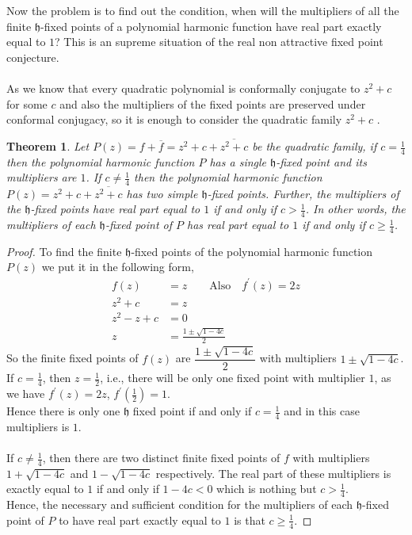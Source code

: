 \documentclass[a4paper,12pt,reqno]{amsart}
\newtheorem{thm}{Theorem}
\begin{document}
Now the problem is to find out the condition, when will the multipliers of all the finite $\mathfrak{h}$-fixed points of a polynomial harmonic function have real part exactly equal to $1$? This is an supreme situation of the real non attractive fixed point conjecture.
${}$\\ ${}$\\
 	As we know that every quadratic polynomial is conformally conjugate to $z^{2}+c$ for some $c$ and also the multipliers of the fixed points are preserved under conformal conjugacy, so it is enough to consider the quadratic family $z^{2}+c$ \cite{The real non-attractive fixed point conjecture and beyond}.
 	\begin{thm}\label{T3}
 	Let $P(z)=f+\overline{f}=z^{2}+c+\overline{z^{2}+c}$ be the quadratic family, if $c=\frac{1}{4}$ then the polynomial harmonic function $P$ has a single $\mathfrak{h}$-fixed point and its multipliers are $1$. If $c\neq\frac{1}{4}$ then the polynomial harmonic function  $P(z)=z^{2}+c+\overline{z^{2}+c}$ has two simple $\mathfrak{h}$-fixed points. Further, the multipliers of the $\mathfrak{h}$-fixed points have real part equal to $1$ if and only if $c>\frac{1}{4}$. In other words, the multipliers of each $\mathfrak{h}$-fixed point of $P$ has real part equal to $1$ if and only if $c\geq\frac{1}{4}$.
 	
 	\end{thm}
 	\begin{proof}
 	To find the finite $\mathfrak{h}$-fixed points of the polynomial harmonic function $P(z)$ we put it in the following form,
\begin{align*}
f(z)&=z\quad\quad \mbox{Also}\quad f^{\prime}(z)=2z\\
z^{2}+c&=z\\
z^{2}-z+c&=0\\
z&=\frac{1\pm\sqrt{1-4c}}{2}
\end{align*}
So the finite fixed points of $f(z)$ are $\dfrac{1\pm\sqrt{1-4c}}{2}$ with multipliers $1\pm\sqrt{1-4c}$.\\
 If $c=\frac{1}{4}$, then $z=\frac{1}{2}$, i.e., there will be only one fixed point with multiplier $1$, as we have $f^{\prime}(z)=2z$, $f^{\prime}(\frac{1}{2})=1$.\\
 Hence there is only one $\mathfrak{h}$ fixed point if and only if $c=\frac{1}{4}$ and in this case multipliers is $1$.
 ${}$\\ ${}$\\
 If $c\neq\frac{1}{4}$, then there are two distinct finite fixed points of $f$ with multipliers $1+\sqrt{1-4c}$ and $1-\sqrt{1-4c}$ respectively. The real part of these multipliers is exactly equal to $1$ if and only if $1-4c<0$ which is nothing but $c>\frac{1}{4}$.\\
 Hence, the necessary and sufficient condition for the multipliers of each $\mathfrak{h}$-fixed point of $P$  to have real part exactly equal to $1$ is that $c\geq\frac{1}{4}$.
 	\end{proof}
\end{document}
